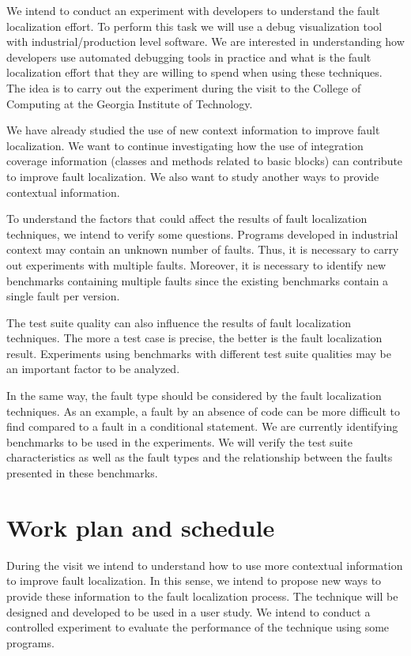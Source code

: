\documentclass[12pt,a4paper,espaco=umemeio,noindentfirst,oneside,openany,tocpage=plain,pnumromarab,ruledheader,time,anapcustomindent]{sty/abnt}
\begin{document}
We intend to conduct an experiment with developers to understand the fault localization effort. To perform this task we will use a debug visualization 
tool with industrial/production level software. We are interested in understanding how developers use automated debugging tools in practice and what is the fault 
localization effort that they are willing to spend when using these techniques. The idea is to carry out the experiment during the visit to the College of Computing 
at the Georgia Institute of Technology.

We have already studied the use of new context information to improve fault localization. We want to continue investigating how the use of integration coverage 
information (classes and methods related to basic blocks) can contribute to improve fault localization. We also want to study another ways to provide contextual 
information.

To understand the factors that could affect the results of fault localization techniques, we intend to verify some questions. Programs developed in industrial context 
may contain an unknown number of faults. Thus, it is necessary to carry out experiments with multiple faults. Moreover, it is necessary to identify new benchmarks 
containing multiple faults since the existing benchmarks contain a single fault per version.

The test suite quality can also influence the results of fault localization techniques. The more a test case is precise, the better is the fault localization result. 
Experiments using benchmarks with different test suite qualities may be an important factor to be analyzed.

In the same way, the fault type should be considered by the fault localization techniques. As an example, a fault by an absence of code can be more difficult to find 
compared to a fault in a conditional statement. We are currently identifying benchmarks to be used in the experiments. We will verify the test suite characteristics 
as well as the fault types and the relationship between the faults presented in these benchmarks.						


\section{Work plan and schedule}
\label{workplan}

During the visit we intend to understand how to use more contextual information to improve fault localization. In this sense, we intend to propose new ways to provide 
these information to the fault localization process. The technique will be designed and developed to be used in a user study. We intend to conduct a controlled 
experiment to evaluate the performance of the technique using some programs. 
\end{document}
